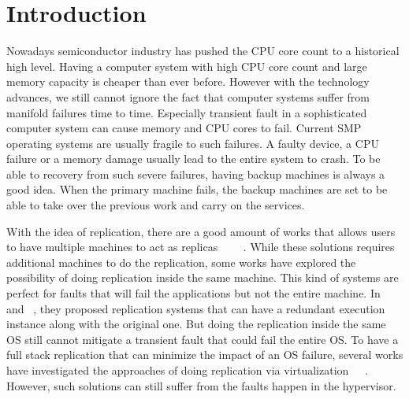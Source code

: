 \chapter{Introduction}




Nowadays semiconductor industry has pushed the CPU core count to a historical high level. Having a computer system with high CPU core count and large memory capacity is cheaper than ever before. However with the technology advances, we still cannot ignore the fact that computer systems suffer from manifold failures time to time. Especially transient fault in a sophisticated computer system can cause memory and CPU cores to fail. Current SMP operating systems are usually fragile to such failures. A faulty device, a CPU failure or a memory damage usually lead to the entire system to crash. To be able to recovery from such severe failures, having backup machines is always a good idea. When the primary machine fails, the backup machines are set to be able to take over the previous work and carry on the services.

With the idea of replication, there are a good amount of works that allows users to have multiple machines to act as replicas ~\cite{cui2015p}~\cite{zagorodnov2009practical}~\cite{singh2009zeno}~\cite{mao2008mencius}. While these solutions requires additional machines to do the replication, some works have explored the possibility of doing replication inside the same machine. This kind of systems are perfect for faults that will fail the applications but not the entire machine. In ~\cite{zhang2012runtime} and ~\cite{lee2010respec}, they proposed replication systems that can have a redundant execution instance along with the original one. But doing the replication inside the same OS still cannot mitigate a transient fault that could fail the entire OS. To have a full stack replication that can minimize the impact of an OS failure, several works have investigated the approaches of doing replication via virtualization~\cite{bressoud1996hypervisor}~\cite{lorch2015tardigrade}~\cite{dunlap2002revirt}. However, such solutions can still suffer from the faults happen in the hypervisor.

